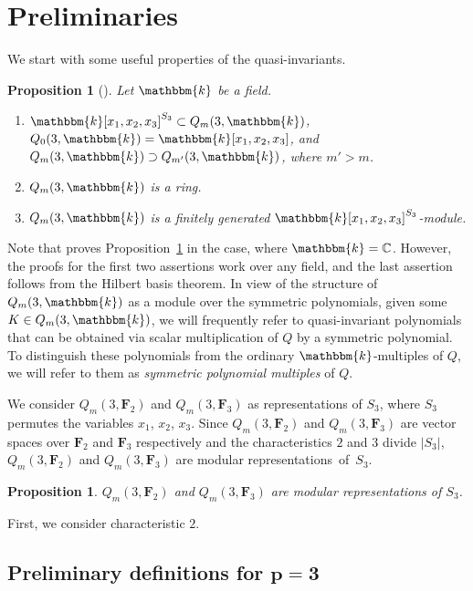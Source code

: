 \documentclass[11pt]{article}
\numberwithin{equation}{section}
\newtheorem{Proposition}[Theorem]{Proposition}
\theoremstyle{definition}
\numberwithin{equation}{section}
\renewcommand{\k}{\mathbbm{k}}
\newcommand{\C}{\mathbb{C}}
\begin{document}
\section{Preliminaries}\label{prelim}
We start with some useful properties of the quasi-invariants.
\begin{Proposition}[\cite{etingof2002lectures}]\label{firstProp}
 Let $\k$ be a field.
\begin{enumerate}\itemsep=0pt
 \item[$1$.] $\k[x_1,x_2,x_3]^{S_3}\subset Q_m(3,\k)$, $Q_0(3,\k) = \k[x_1,x_2,x_3]$, and $Q_m(3,\k)\supset Q_{m'}(3,\k)$, where ${m'>m}$.
 \item[$2$.] $Q_m(3,\k)$ is a ring.
 \item[$3$.] $Q_m(3,\k)$ is a finitely generated $\k[x_1,x_2,x_3]^{S_3}$-module.
\end{enumerate}
\end{Proposition}

Note that \cite{etingof2002lectures} proves Proposition~\ref{firstProp} in the case, where $\k=\C$. However, the proofs for the first two assertions work over any field, and the last assertion follows from the Hilbert basis theorem. In view of the structure of $Q_m(3,\k)$ as a module over the symmetric polynomials, given some $K\in Q_m(3,\k)$, we will frequently refer to quasi-invariant polynomials that can be obtained via scalar multiplication of $Q$ by a symmetric polynomial. To distinguish these polynomials from the ordinary $\k$-multiples of $Q$, we will refer to them as \emph{symmetric polynomial multiples} of $Q$.

We consider $Q_m(3, \mathbf{F}_{2})$ and $Q_m(3, \mathbf{F}_{3})$ as representations of $S_3$, where $S_3$ permutes the variables $x_1$, $x_2$, $x_3$. Since $Q_m(3, \mathbf{F}_{2})$ and $Q_m(3, \mathbf{F}_{3})$ are vector spaces over $\mathbf{F}_2$ and $\mathbf{F}_3$ respectively and the characteristics $2$ and $3$ divide $|S_3|$, $Q_m(3, \mathbf{F}_{2})$ and $Q_m(3, \mathbf{F}_{3})$ are modular representations~of~$S_3$.

\begin{Proposition}
 $Q_m(3, \mathbf{F}_{2})$ and $Q_m(3, \mathbf{F}_{3})$ are modular representations of $S_3$.
\end{Proposition}

First, we consider characteristic $2$.


\setcounter{Theorem}{6}\setcounter{subsection}{1}
\subsection[Preliminary definitions for p=3]{Preliminary definitions for $\boldsymbol{p=3}$}
\end{document}
